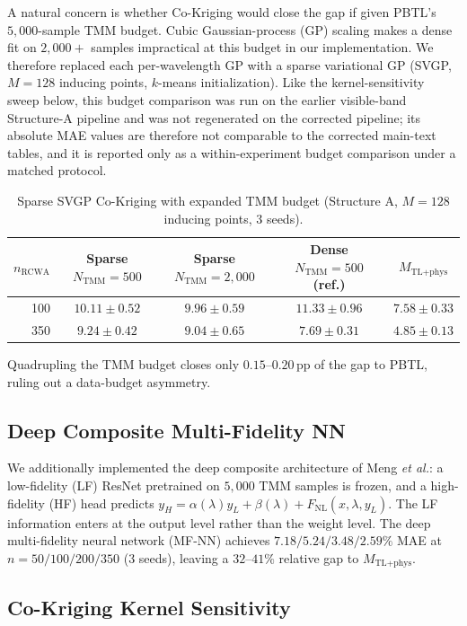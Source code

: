 \documentclass[11pt]{article}
\newcommand{\Mtlphys}{\ensuremath{M_\text{TL+phys}}}
\begin{document}
A natural concern is whether Co-Kriging would close the gap if given PBTL's $5{,}000$-sample TMM budget. Cubic Gaussian-process (GP) scaling makes a dense fit on $2{,}000+$ samples impractical at this budget in our implementation. We therefore replaced each per-wavelength GP with a sparse variational GP (SVGP, $M=128$ inducing points, $k$-means initialization). Like the kernel-sensitivity sweep below, this budget comparison was run on the earlier visible-band Structure-A pipeline and was not regenerated on the corrected pipeline; its absolute MAE values are therefore not comparable to the corrected main-text tables, and it is reported only as a within-experiment budget comparison under a matched protocol.

\begin{table}[htbp]\centering\small
\caption{Sparse SVGP Co-Kriging with expanded TMM budget (Structure A, $M=128$ inducing points, 3 seeds).}
\label{tab:sparse_cokriging}
\begin{tabular}{r ccc c}\toprule
$n_\text{RCWA}$ & Sparse $N_\text{TMM}=500$ & Sparse $N_\text{TMM}=2{,}000$ & Dense $N_\text{TMM}=500$ (ref.) & $\Mtlphys$\\\midrule
100 & $10.11 \pm 0.52$ & $9.96 \pm 0.59$ & $11.33 \pm 0.96$ & $\mathbf{7.58 \pm 0.33}$\\
350 & $9.24 \pm 0.42$  & $9.04 \pm 0.65$ & $7.69 \pm 0.31$  & $\mathbf{4.85 \pm 0.13}$\\\bottomrule
\end{tabular}
\end{table}

Quadrupling the TMM budget closes only $0.15$--$0.20$\,pp of the gap to PBTL, ruling out a data-budget asymmetry.

\subsection*{Deep Composite Multi-Fidelity NN}

We additionally implemented the deep composite architecture of Meng \textit{et al.}: a low-fidelity (LF) ResNet pretrained on $5{,}000$ TMM samples is frozen, and a high-fidelity (HF) head predicts $y_H = \alpha(\lambda)y_L + \beta(\lambda) + F_\text{NL}(x, \lambda, y_L)$. The LF information enters at the output level rather than the weight level. The deep multi-fidelity neural network (MF-NN) achieves $7.18/5.24/3.48/2.59\%$ MAE at $n=50/100/200/350$ ($3$ seeds), leaving a $32$--$41\%$ relative gap to $\Mtlphys$.

\subsection*{Co-Kriging Kernel Sensitivity}
\end{document}
